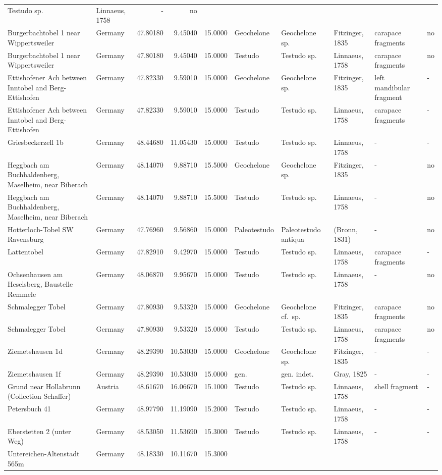 \begin{landscape}
{\begin{longtable}[]{@{}llrrrlllll@{}}
Testudo sp. & Linnaeus, 1758 & - & no\tabularnewline
Burgerbachtobel 1 near Wippertsweiler & Germany & 47.80180 & 9.45040 &
15.0000 & Geochelone & Geochelone sp. & Fitzinger, 1835 & carapace
fragments & no\tabularnewline
Burgerbachtobel 1 near Wippertsweiler & Germany & 47.80180 & 9.45040 &
15.0000 & Testudo & Testudo sp. & Linnaeus, 1758 & carapace fragments &
no\tabularnewline
Ettishofener Ach between Inntobel and Berg-Ettishofen & Germany &
47.82330 & 9.59010 & 15.0000 & Geochelone & Geochelone sp. & Fitzinger,
1835 & left mandibular fragment & -\tabularnewline
Ettishofener Ach between Inntobel and Berg-Ettishofen & Germany &
47.82330 & 9.59010 & 15.0000 & Testudo & Testudo sp. & Linnaeus, 1758 &
carapace fragments & -\tabularnewline
Griesbeckerzell 1b & Germany & 48.44680 & 11.05430 & 15.0000 & Testudo &
Testudo sp. & Linnaeus, 1758 & - & -\tabularnewline
Heggbach am Buchhaldenberg, Maselheim, near Biberach & Germany &
48.14070 & 9.88710 & 15.5000 & Geochelone & Geochelone sp. & Fitzinger,
1835 & - & no\tabularnewline
Heggbach am Buchhaldenberg, Maselheim, near Biberach & Germany &
48.14070 & 9.88710 & 15.5000 & Testudo & Testudo sp. & Linnaeus, 1758 &
- & no\tabularnewline
Hotterloch-Tobel SW Ravensburg & Germany & 47.76960 & 9.56860 & 15.0000
& Paleotestudo & Paleotestudo antiqua & (Bronn, 1831) & - &
no\tabularnewline
Lattentobel & Germany & 47.82910 & 9.42970 & 15.0000 & Testudo & Testudo
sp. & Linnaeus, 1758 & carapace fragments & -\tabularnewline
Ochsenhausen am Heselsberg, Baustelle Remmele & Germany & 48.06870 &
9.95670 & 15.0000 & Testudo & Testudo sp. & Linnaeus, 1758 & - &
no\tabularnewline
Schmalegger Tobel & Germany & 47.80930 & 9.53320 & 15.0000 & Geochelone
& Geochelone cf.~sp. & Fitzinger, 1835 & carapace fragments &
no\tabularnewline
Schmalegger Tobel & Germany & 47.80930 & 9.53320 & 15.0000 & Testudo &
Testudo sp. & Linnaeus, 1758 & carapace fragments & no\tabularnewline
Ziemetshausen 1d & Germany & 48.29390 & 10.53030 & 15.0000 & Geochelone
& Geochelone sp. & Fitzinger, 1835 & - & -\tabularnewline
Ziemetshausen 1f & Germany & 48.29390 & 10.53030 & 15.0000 & gen. & gen.
indet. & Gray, 1825 & - & -\tabularnewline
Grund near Hollabrunn (Collection Schaffer) & Austria & 48.61670 &
16.06670 & 15.1000 & Testudo & Testudo sp. & Linnaeus, 1758 & shell
fragment & -\tabularnewline
Petersbuch 41 & Germany & 48.97790 & 11.19090 & 15.2000 & Testudo &
Testudo sp. & Linnaeus, 1758 & - & -\tabularnewline
Eberstetten 2 (unter Weg) & Germany & 48.53050 & 11.53690 & 15.3000 &
Testudo & Testudo sp. & Linnaeus, 1758 & - & -\tabularnewline
Untereichen-Altenstadt 565m & Germany & 48.18330 & 10.11670 & 15.3000 &

\end{longtable}}
\end{landscape}
